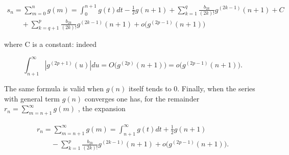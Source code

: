 \[
\begin{array}{l} s _ {n} = \sum_ {m = 0} ^ {n} g (m) = \int_ {0} ^ {n + 1} g (t) d t - \frac {1}{2} g (n + 1) + \sum_ {k = 1} ^ {q} \frac {b _ {2 k}}{(2 k) !} g ^ {(2 k - 1)} (n + 1) + C \\ \qquad + \sum_ {k = q + 1} ^ {p} \frac {b _ {2 k}}{(2 k) !} g ^ {(2 k - 1)} (n + 1) + o \big (g ^ {(2 p - 1)} (n + 1) \big) \end{array}
\]

where C is a constant: indeed

\[
\int_ {n + 1} ^ {\infty} \left| g ^ {(2 p + 1)} (u) \right| d u = O \big (g ^ {(2 p)} (n + 1) \big) = o \big (g ^ {(2 p - 1)} (n + 1) \big).
\]

The same formula is valid when \(g(n)\) itself tends to 0. Finally, when the series with general term \(g(n)\) converges one has, for the remainder \(r_n = \sum_{m=n+1}^{\infty} g(m)\) , the expansion

\[
\begin{array}{l} r _ {n} = \sum_ {m = n + 1} ^ {\infty} g (m) = \int_ {n + 1} ^ {\infty} g (t) d t + \frac {1}{2} g (n + 1) \\ \qquad - \sum_ {k = 1} ^ {p} \frac {b _ {2 k}}{(2 k) !} g ^ {(2 k - 1)} (n + 1) + o \big (g ^ {(2 p - 1)} (n + 1) \big). \end{array}
\]

\setcounter{exercisegroup}{0}
